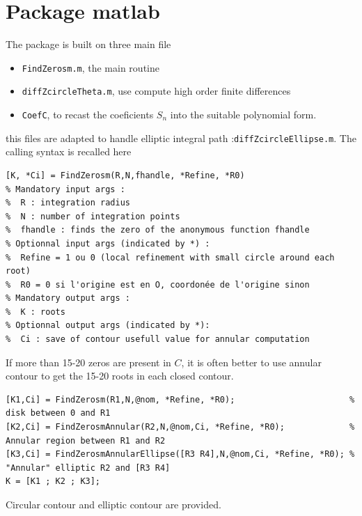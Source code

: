 \documentclass[a4paper,10pt]{article}
\begin{document}
\section{Package matlab}
The package is built on three main file
\begin{itemize}
\item \texttt{FindZerosm.m}, the main routine
\item \texttt{diffZcircleTheta.m}, use compute high order finite differences
\item \texttt{CoefC}, to recast the coeficients $S_n$ into the suitable polynomial form.
\end{itemize}
this files are adapted to handle elliptic integral path :\texttt{diffZcircleEllipse.m}. The calling syntax is recalled here
\begin{verbatim}
[K, *Ci] = FindZerosm(R,N,fhandle, *Refine, *R0)
% Mandatory input args :
%  R : integration radius
%  N : number of integration points
%  fhandle : finds the zero of the anonymous function fhandle
% Optionnal input args (indicated by *) :
%  Refine = 1 ou 0 (local refinement with small circle around each root)
%  R0 = 0 si l'origine est en O, coordonée de l'origine sinon
% Mandatory output args :
%  K : roots
% Optionnal output args (indicated by *):
%  Ci : save of contour usefull value for annular computation
\end{verbatim}
If more than 15-20 zeros are present in $C$, it is often better to use annular contour to get the 15-20 roots in each closed contour.
\begin{verbatim}
[K1,Ci] = FindZerosm(R1,N,@nom, *Refine, *R0);                       % disk between 0 and R1
[K2,Ci] = FindZerosmAnnular(R2,N,@nom,Ci, *Refine, *R0);             % Annular region between R1 and R2
[K3,Ci] = FindZerosmAnnularEllipse([R3 R4],N,@nom,Ci, *Refine, *R0); % "Annular" elliptic R2 and [R3 R4]
K = [K1 ; K2 ; K3];
\end{verbatim}
Circular contour and elliptic contour are provided. %


\end{document}
